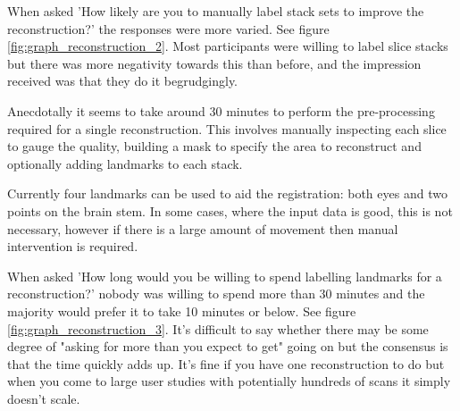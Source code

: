 When asked 'How likely are you to manually label stack sets to improve the reconstruction?' the responses were more varied. See figure \ref{fig:graph_reconstruction_2}. Most participants were willing to label slice stacks but there was more negativity towards this than before, and the impression received was that they do it begrudgingly.

Anecdotally it seems to take around 30 minutes to perform the pre-processing required for a single reconstruction. This involves manually inspecting each slice to gauge the quality, building a mask to specify the area to reconstruct and optionally adding landmarks to each stack.

Currently four landmarks can be used to aid the registration: both eyes and two points on the brain stem. In some cases, where the input data is good, this is not necessary, however if there is a large amount of movement then manual intervention is required.

When asked 'How long would you be willing to spend labelling landmarks for a reconstruction?' nobody was willing to spend more than 30 minutes and the majority would prefer it to take 10 minutes or below. See figure \ref{fig:graph_reconstruction_3}. It's difficult to say whether there may be some degree of "asking for more than you expect to get" going on but the consensus is that the time quickly adds up. It's fine if you have one reconstruction to do but when you come to large user studies with potentially hundreds of scans it simply doesn't scale.


